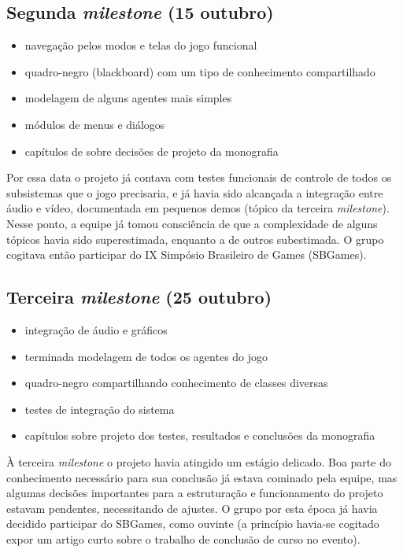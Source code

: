 \subsection{Segunda \emph{milestone} (15 outubro)}
\begin{itemize}
\item navegação pelos modos e telas do jogo funcional
\item quadro-negro (blackboard) com um tipo de conhecimento compartilhado
\item modelagem de alguns agentes mais simples
\item módulos de menus e diálogos
\item capítulos de sobre decisões de projeto da monografia
\end{itemize}

Por essa data o projeto já contava com testes funcionais de controle de todos os subsistemas que o jogo precisaria, e já havia sido alcançada a integração entre áudio e vídeo, documentada em pequenos demos (tópico da terceira \emph{milestone}). Nesse ponto, a equipe já tomou consciência de que a complexidade de alguns tópicos havia sido superestimada, enquanto a de outros subestimada. 
O grupo cogitava então participar do IX Simpósio Brasileiro de Games (SBGames).

\subsection{Terceira \emph{milestone} (25 outubro)}
\begin{itemize}
\item integração de áudio e gráficos
\item terminada modelagem de todos os agentes do jogo
\item quadro-negro compartilhando conhecimento de classes diversas
\item testes de integração do sistema
\item capítulos sobre projeto dos testes, resultados e conclusões da monografia
\end{itemize}

À terceira \emph{milestone} o projeto havia atingido um estágio delicado. Boa parte do conhecimento necessário para sua conclusão já estava cominado pela equipe, mas algumas decisões importantes para a estruturação  e funcionamento do projeto estavam pendentes, necessitando de ajustes. O grupo por esta época já havia decidido participar do SBGames, como ouvinte (a princípio havia-se cogitado expor um artigo curto sobre o trabalho de conclusão de curso no evento).   

